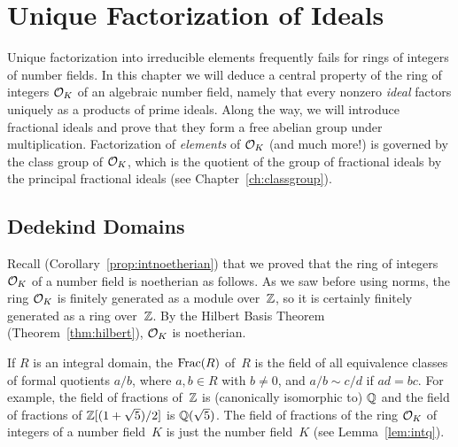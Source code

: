 \chapter{Unique Factorization of Ideals}
Unique factorization into irreducible elements frequently fails for
rings of integers of number fields.  In this chapter we will deduce a
central property of the ring of integers $\mathcal{O}_K$ of an algebraic number
field, namely that every nonzero {\em ideal} factors uniquely as a
products of prime ideals.  Along the way, we will introduce fractional
ideals and prove that they form a free abelian group under
multiplication.  Factorization of {\em elements} of $\mathcal{O}_K$ (and much
more!) is governed by the class group of $\mathcal{O}_K$, which is the quotient
of the group of fractional ideals by the principal fractional ideals
(see Chapter~\ref{ch:classgroup}).

\section{Dedekind Domains}
Recall (Corollary~\ref{prop:intnoetherian}) that we proved that the
ring of integers $\mathcal{O}_K$ of a number field is noetherian as follows.
As we saw before using norms, the ring $\mathcal{O}_K$ is finitely generated as
a module over~$\mathbb{Z}$, so it is certainly finitely generated as a ring
over~$\mathbb{Z}$.  By the Hilbert Basis Theorem (Theorem~\ref{thm:hilbert}),
$\mathcal{O}_K$ is noetherian.

If $R$ is an integral domain, the  $\operatorname{Frac}(R)$
of~$R$ is the field of all equivalence classes of formal quotients
$a/b$, where $a,b \in R$ with $b\neq 0$, and $a/b\sim c/d$ if $ad=bc$.
For example, the field of fractions of~$\mathbb{Z}$ is (canonically isomorphic
to) $\mathbb{Q}$ and the field of fractions of $\mathbb{Z}[(1+\sqrt{5})/2]$ is
$\mathbb{Q}(\sqrt{5})$.  The field of fractions of the ring $\mathcal{O}_K$ of integers
of a number field~$K$ is just the number field~$K$ (see Lemma~\ref{lem:intq}).

